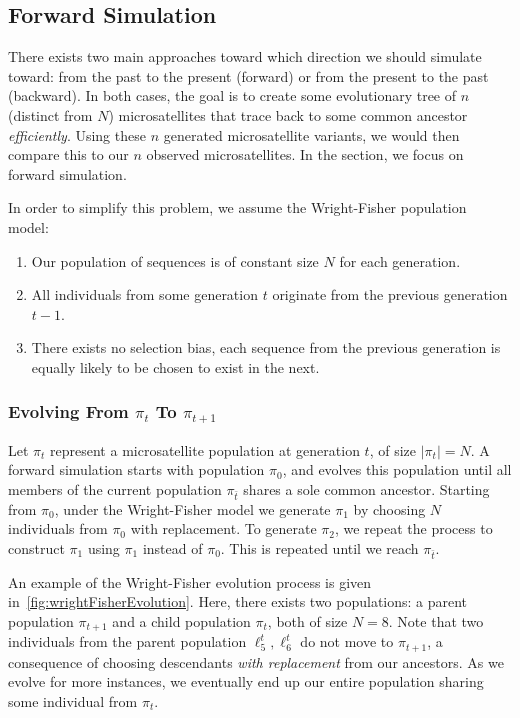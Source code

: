 \subsection{Forward Simulation}\label{subsec:fs}
There exists two main approaches toward which direction we should simulate toward: from the past to the present
(forward) or from the present to the past (backward).
In both cases, the goal is to create some evolutionary tree of $n$ (distinct from $N$) microsatellites that trace back
to some common ancestor \emph{efficiently}.
Using these $n$ generated microsatellite variants, we would then compare this to our $n$ observed microsatellites.
In the section, we focus on forward simulation.

In order to simplify this problem, we assume the Wright-Fisher population model:
\begin{enumerate}
    \item Our population of sequences is of constant size $N$ for each generation.
    \item All individuals from some generation $t$ originate from the previous generation $t - 1$.
    \item There exists no selection bias, each sequence from the previous generation is equally likely to be
        chosen to exist in the next.
\end{enumerate}

\subsubsection{Evolving From $\pi_t$ To $\pi_{t+1}$}
Let $\pi_t$ represent a microsatellite population at generation $t$, of size $\left|\pi_t \right| = N$.
A forward simulation starts with population $\pi_0$, and evolves this population until all members of the current
population $\pi_{\bar{t}}$ shares a sole common ancestor.
Starting from $\pi_0$, under the Wright-Fisher model we generate $\pi_1$ by choosing $N$ individuals from $\pi_0$ with
replacement.
To generate $\pi_2$, we repeat the process to construct $\pi_1$ using $\pi_1$ instead of $\pi_0$.
This is repeated until we reach $\pi_{\bar{t}}$.

An example of the Wright-Fisher evolution process is given in~\autoref{fig:wrightFisherEvolution}.
Here, there exists two populations: a parent population $\pi_{t+1}$ and a child population $\pi_t$, both of size $N=8$.
Note that two individuals from the parent population $\ell_5^t, \ell_6^t$ do not move to $\pi_{t+1}$, a consequence of
choosing descendants \emph{with replacement} from our ancestors.
As we evolve for more instances, we eventually end up our entire population sharing some individual from $\pi_t$.

